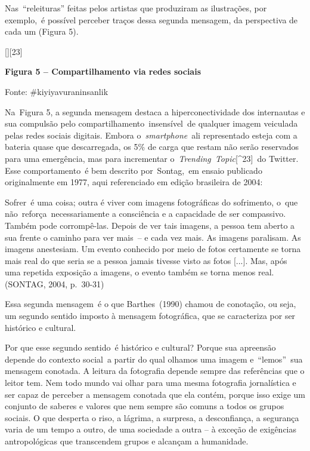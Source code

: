 \documentclass[
  letterpaper,
  a4paper,
  12pt]{scrbook}
\renewenvironment{quote}
  {\par\singlespacing\small\list{}{\rightmargin=0cm \leftmargin=4cm}%
   \item\relax}
  {\endlist}
\begin{document}
Nas~``releituras'' feitas pelos artistas que produziram as ilustrações,
por exemplo,~é possível perceber traços dessa segunda mensagem, da
perspectiva de cada um (Figura 5). ~

{[}{]}{[}23{]}~

\protect\hypertarget{_Ref503520168}{}{}\textbf{Figura 5 --
Compartilhamento via redes sociais}

Fonte: \#kiyiyavuraninsanlik~ ~

Na~Figura 5, a segunda mensagem destaca a hiperconectividade dos
internautas e sua compulsão pelo compartilhamento~insensível~de qualquer
imagem veiculada pelas redes sociais digitais. Embora
o~\emph{smartphone}~ali representado esteja com a bateria quase que
descarregada, os 5\% de carga que restam não serão reservados para uma
emergência, mas para incrementar o~\emph{Trending~Topic}{[}\^{}23{]}~do
Twitter. Esse comportamento~é bem descrito por~Sontag,~em ensaio
publicado originalmente em 1977, aqui referenciado em edição brasileira
de 2004:~ ~

\begin{quote}
Sofrer~é uma coisa; outra é viver com imagens fotográficas do
sofrimento, o~que não~reforça~necessariamente a consciência e a
capacidade de ser compassivo. Também pode corrompê-las. Depois de ver
tais imagens, a pessoa tem aberto a sua frente o caminho para ver
mais~-- e cada vez mais. As imagens paralisam. As imagens anestesiam. Um
evento conhecido por meio de fotos certamente se torna mais real do que
seria se a pessoa jamais tivesse visto as fotos {[}...{]}. Mas, após uma
repetida exposição a imagens, o evento também se torna menos real.
(SONTAG, 2004, p.~30-31)~ ~
\end{quote}

Essa segunda mensagem~é o que Barthes~(1990) chamou de conotação, ou
seja, um segundo sentido imposto à mensagem fotográfica, que se
caracteriza por ser histórico e cultural.~

Por que esse segundo sentido~é histórico e cultural? Porque sua
apreensão depende do contexto social~a partir do qual olhamos uma imagem
e~``lemos''\emph{~}sua mensagem conotada. A leitura da fotografia
depende sempre das referências que o leitor tem. Nem todo mundo vai
olhar para uma mesma fotografia jornalística e ser capaz de perceber a
mensagem conotada que ela contém, porque isso exige um conjunto de
saberes e valores que nem sempre são comuns a todos os grupos sociais. O
que desperta o riso, a lágrima, a surpresa, a desconfiança, a segurança
varia de um tempo a outro, de uma sociedade a outra -- à exceção de
exigências antropológicas que transcendem grupos e alcançam a
humanidade.~
\end{document}
